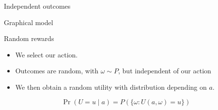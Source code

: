 \documentclass[smaller]{beamer}
\begin{document}
\begin{frame}[label={sec:orga39deca}]{Independent outcomes}
\begin{block}{Graphical model}
\begin{center}
\end{center}
\end{block}

\begin{block}{Random rewards}
\begin{itemize}
\item We \alert{select} our action.
\item Outcomes are \alert{random}, with \(\omega \sim P\), but \alert{independent} of our action
\item We then obtain a random \alert{utility} with distribution depending on \(a\).
\end{itemize}
\[
\Pr(U = u \mid a) = P(\{\omega : U(a, \omega) = u\})
\]
\end{block}
\end{frame}
\end{document}
